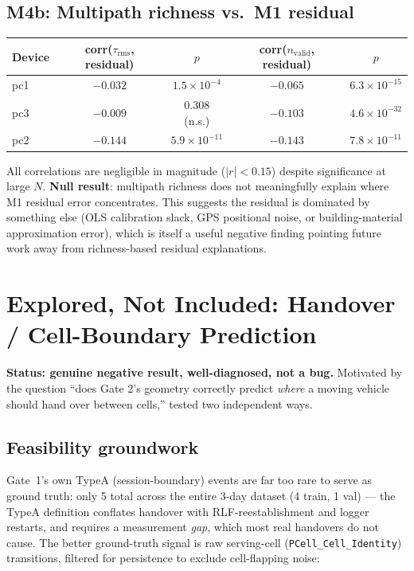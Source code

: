 \documentclass[11pt]{article}
\begin{document}
\subsection{M4b: Multipath richness vs.\ M1 residual}
\begin{table}[h]
\centering
\begin{tabular}{lcccc}
\toprule
Device & corr($\tau_\text{rms}$, residual) & $p$ & corr($n_\text{valid}$, residual) & $p$ \\
\midrule
pc1 & $-0.032$ & $1.5\times10^{-4}$ & $-0.065$ & $6.3\times10^{-15}$ \\
pc3 & $-0.009$ & $0.308$ (n.s.)     & $-0.103$ & $4.6\times10^{-32}$ \\
pc2 & $-0.144$ & $5.9\times10^{-11}$ & $-0.143$ & $7.8\times10^{-11}$ \\
\bottomrule
\end{tabular}
\end{table}
All correlations are negligible in magnitude ($|r| < 0.15$) despite
significance at large $N$. \textbf{Null result}: multipath richness does
not meaningfully explain where M1 residual error concentrates. This
suggests the residual is dominated by something else (OLS calibration
slack, GPS positional noise, or building-material approximation error),
which is itself a useful negative finding pointing future work away from
richness-based residual explanations.

\section{Explored, Not Included: Handover / Cell-Boundary Prediction}
\label{sec:handover}

\textbf{Status: genuine negative result, well-diagnosed, not a bug.}
Motivated by the question ``does Gate 2's geometry correctly predict
\emph{where} a moving vehicle should hand over between cells,'' tested
two independent ways.

\subsection{Feasibility groundwork}
Gate~1's own TypeA (session-boundary) events are far too rare to serve as
ground truth: only 5 total across the entire 3-day dataset (4 train, 1
val) — the TypeA definition conflates handover with RLF-reestablishment
and logger restarts, and requires a measurement \emph{gap}, which most
real handovers do not cause. The better ground-truth signal is raw
serving-cell (\texttt{PCell\_Cell\_Identity}) transitions, filtered for
persistence to exclude cell-flapping noise:
\end{document}
